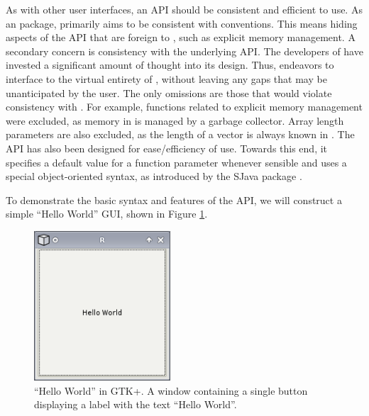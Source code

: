 \documentclass[article]{jss}
\begin{document}



As with other user interfaces,
an API should be consistent and efficient to use. As an 
package,
 primarily aims to be consistent with 
conventions. This
means hiding aspects of the  API that are foreign to
,
such as explicit memory management. A secondary concern is consistency 
with the underlying  API. The developers of
 have invested a significant amount of thought into its
design. Thus,
 endeavors to interface  to the virtual
entirety of ,
without leaving any gaps that may be unanticipated by the user. 
The only omissions are those that would violate consistency with
. For example, functions related to explicit memory
management were excluded, as memory in  is managed by a
garbage collector. Array length parameters are also excluded, as the
length of a vector is always known in .
The  API has also been designed for ease/efficiency of use.
Towards this end, it specifies a default value for a function
parameter whenever sensible and uses a special object-oriented syntax,
as introduced by the SJava package \citep{sjava}.

To demonstrate the basic syntax and features of the  API,
we will construct a simple ``Hello World'' GUI, shown in Figure
\ref{fig:hello-world}.

\begin{figure}
\begin{center}
\includegraphics[width=2in]{hello-world.png}
\caption{\label{fig:hello-world}``Hello World'' in GTK+. 
A window containing a single button displaying a label with the text
``Hello World''.}
\end{center}
\end{figure}
\end{document}
